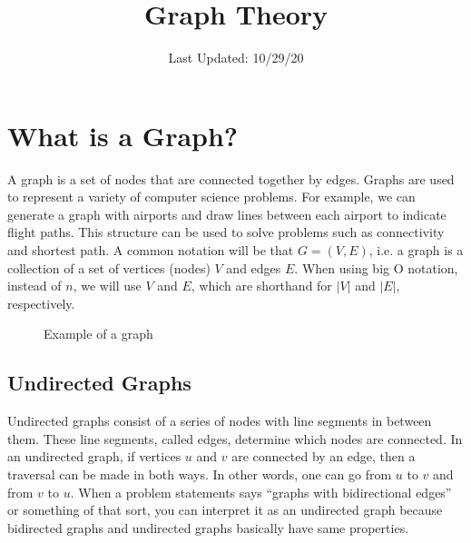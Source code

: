 \documentclass{article}
\title{Graph Theory}
\author{}
\date{Last Updated: 10/29/20}
\begin{document}
\maketitle

\section{What is a Graph?}
A graph is a set of nodes that are connected together by edges.
Graphs are used to represent a variety of computer science problems.
For example, we can generate a graph with airports and draw lines between each
airport to indicate flight paths. This structure can be used to solve problems
such as connectivity and shortest path.
A common notation will be that \( G = (V, E) \), i.e. a graph is a collection
of a set of vertices (nodes) \( V \) and edges \( E \).
When using big O notation, instead of \( n \), we will use \( V \) and \( E \),
which are shorthand for \( \lvert V \rvert \) and
\( \lvert E \rvert \), respectively.  

\begin{figure} [H]
    \begin{center}
    \end{center}
    \caption{Example of a graph}
\end{figure}

\subsection{Undirected Graphs}
Undirected graphs consist of a series of nodes with line segments in between them.
These line segments, called edges, determine which nodes are connected.
In an undirected graph, if vertices \( u \) and \( v \) are connected by an edge,
then a traversal can be made in both ways.
In other words, one can go from \( u \) to \( v \) and from \( v \) to \( u \).
When a problem statements says ``graphs with bidirectional edges'' or something
of that sort, you can interpret it as an undirected graph because bidirected
graphs and undirected graphs basically have same properties.
\end{document}
